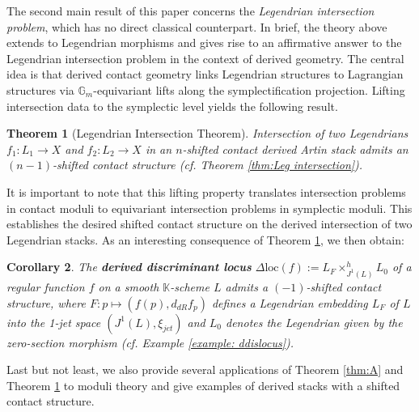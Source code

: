 \documentclass[reqno]{amsart}
\newtheorem{theorem}{Theorem}[section]
\newtheorem{corollary}[theorem]{Corollary}
\theoremstyle{definition}
\theoremstyle{remark}
\newcommand{\Gm}{\mathbb{G}_m}
\newcommand{\K}{\mathbb{K}}
\newcommand{\bfem}[1]{\textbf{\textit{#1}}}
\begin{document}
The second main result of this paper concerns the \textit{Legendrian intersection problem}, which has no direct classical counterpart. In brief, the theory above extends to Legendrian morphisms and gives rise to an affirmative answer to the Legendrian intersection problem in the context of derived geometry. 
The central idea is that derived contact geometry links Legendrian structures to Lagrangian structures via $\Gm$-equivariant lifts along the symplectification projection.
Lifting intersection data to the symplectic level yields the following result.

\begin{theorem}[Legendrian Intersection Theorem] \label{thm:B}
Intersection of two Legendrians $f_1 \colon L_1 \to X$ and $f_2 \colon L_2 \to X$ in an $n$-shifted contact derived Artin stack admits 
 an $(n-1)$-shifted  contact structure (cf. Theorem \ref{thm:Leg intersection}).
\end{theorem}
It is important to note that this lifting property translates intersection problems in contact moduli to equivariant intersection problems in symplectic moduli. This establishes the desired shifted contact structure on the derived intersection of two Legendrian stacks.
As an interesting consequence of Theorem \ref{thm:B}, we then obtain:

\begin{corollary}\label{cor:B}
The \bfem{derived discriminant locus}
$ \Delta\mathrm{loc}(f):= L_F \times_{J^1(L)}^h L_0$ of a regular function $f$ on a smooth $\K$-scheme $L$ admits a $(-1)$-shifted contact structure, where  $F:p \mapsto (f(p),d_{dR}f_p)$ defines a Legendrian embedding $L_F$ of $L$ into the 1-jet space $(J^1(L), \xi_{jet})$ and $L_0$ denotes the Legendrian given by the zero-section morphism
    (cf. Example \ref{example: ddislocus}).
\end{corollary}

Last but not least, we also provide several applications of Theorem \ref{thm:A} and Theorem \ref{thm:B} to moduli theory and give examples of derived stacks with a shifted contact structure.
\end{document}
